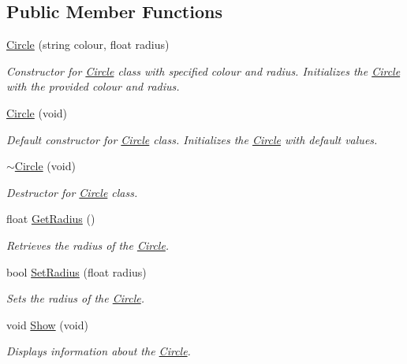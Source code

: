 \subsection*{Public Member Functions}
\begin{DoxyCompactItemize}
\item 
\mbox{\hyperlink{class_circle_ad9d167363a32bc8b1232ec7615a34c6e}{Circle}} (string colour, float radius)
\begin{DoxyCompactList}\small\item\em Constructor for \mbox{\hyperlink{class_circle}{Circle}} class with specified colour and radius. Initializes the \mbox{\hyperlink{class_circle}{Circle}} with the provided colour and radius. \end{DoxyCompactList}\item 
\mbox{\hyperlink{class_circle_a3ea668d8be6a76ab7033c43a57874a11}{Circle}} (void)
\begin{DoxyCompactList}\small\item\em Default constructor for \mbox{\hyperlink{class_circle}{Circle}} class. Initializes the \mbox{\hyperlink{class_circle}{Circle}} with default values. \end{DoxyCompactList}\item 
\mbox{\hyperlink{class_circle_a22d1064e650bcb96834a3056277a4185}{$\sim$\+Circle}} (void)
\begin{DoxyCompactList}\small\item\em Destructor for \mbox{\hyperlink{class_circle}{Circle}} class. \end{DoxyCompactList}\item 
float \mbox{\hyperlink{class_circle_a90014f73c1c55bfdbaab39971f774944}{Get\+Radius}} ()
\begin{DoxyCompactList}\small\item\em Retrieves the radius of the \mbox{\hyperlink{class_circle}{Circle}}. \end{DoxyCompactList}\item 
bool \mbox{\hyperlink{class_circle_a662e7217755cd13ad6669c52514f2d97}{Set\+Radius}} (float radius)
\begin{DoxyCompactList}\small\item\em Sets the radius of the \mbox{\hyperlink{class_circle}{Circle}}. \end{DoxyCompactList}\item 
void \mbox{\hyperlink{class_circle_a9ade44170d48efc91d3c35e8be4e4b5a}{Show}} (void)
\begin{DoxyCompactList}\small\item\em Displays information about the \mbox{\hyperlink{class_circle}{Circle}}. \end{DoxyCompactList}\item 

\end{DoxyCompactItemize}
